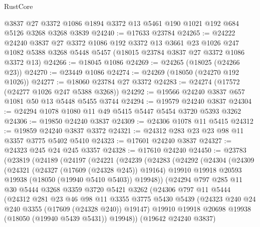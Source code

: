 \begin{lexlean}{RustCore}
\begin{coremodule}
    @3837
    @27
    @3372
    @1086
    @1894
    @3372
    @13
    @5461
    @190
    @1021
    @192
    @684
    @5126
    @3268
    @3268
    @3839
@24240 := @17633 @23784
@24265 := @24222
    @24240
    @3837
    @27
    @3372
    @1086
    @192
    @3372
    @13
    @3661
    @23
    @1026
    @247
    @1082
    @5388
    @3268
    @5448
    @5457
    (@18015 @23784 @3837 @27 @3372 @1086 @3372 @13)
@24266 := @18045 @1086
@24269 := @24265 (@18025 (@24266 @23))
@24270 := @23449 @1086
@24274 := @24269 (@18050 (@24270 @192 @1026))
@24277 := @18060 @23784 @27 @3372
@24283 := @24274 (@17572 (@24277 @1026 @247 @5388 @3268))
@24292 := @19566 @24240 @3837 @657 @1081 @50 @13 @5448 @5455 @3744
@24294 := @19579 @24240 @3837
@24304 := @24294 @1078 @1080 @11 @49 @5415 @5447 @5454 @3720 @5393 @3262
@24306 := @19850 @24240 @3837
@24309 := @24306 @1078 @11 @5415
@24312 := @19859 @24240 @3837 @3372
@24321 := @24312 @283 @23 @23 @98 @11 @3357 @3775 @5402 @5410
@24323 := @17601 @24240 @3837
@24327 := @24323 @245 @24 @245 @3357
@24328 := @17610 @24240
@24450 := @23783
    (@23819
      (@24189
        (@24197
          (@24221
            (@24239
              (@24283
                (@24292
                  (@24304
                    (@24309
                      (@24321
                        (@24327 (@17609 (@24328 @245)) @19164)
                        @19910
                        @19918
                        @20593
                        @19938
                        (@18050 (@19940 @5410 @5403))
                        @19948))
                    (@24294
                      @797
                      @285
                      @11
                      @30
                      @5444
                      @3268
                      @3359
                      @3720
                      @5421
                      @3262
                      (@24306
                        @797
                        @11
                        @5444
                        (@24312
                          @281
                          @23
                          @46
                          @98
                          @11
                          @3355
                          @3775
                          @5430
                          @5439
                          (@24323 @240 @24 @240 @3355 (@17609 (@24328 @240)) @19147)
                          @19910
                          @19918
                          @20698
                          @19938
                          (@18050 (@19940 @5439 @5431))
                          @19948))
                      (@19642 @24240 @3837)

\end{coremodule}
\end{lexlean}
